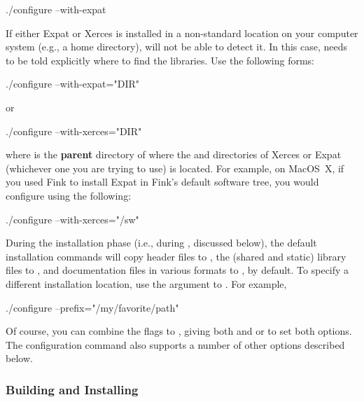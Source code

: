 \documentclass{sbmlmanual}
\begin{document}
\begin{example}[csh]
  ./configure --with-expat
\end{example}

If either Expat or Xerces is installed in a non-standard location on your
computer system (e.g., a home directory),  will not be
able to detect it.  In this case,  needs to be told
explicitly where to find the libraries.  Use the following forms:

\begin{example}[csh]
  ./configure --with-expat="DIR"
\end{example}
or
\begin{example}[csh]
  ./configure --with-xerces="DIR"
\end{example}

where  is the \textbf{parent} directory of where the
 and  directories of Xerces or Expat (whichever one
you are trying to use) is located.  For example, on MacOS~X, if you used
Fink to install Expat in Fink's default software tree, you would configure
\libsbml{} using the following:

\begin{example}[csh]
  ./configure --with-xerces="/sw"
\end{example}

During the installation phase (i.e., during , discussed
below), the default \libsbml{} installation commands will copy header files
to , the (shared and static) library files
to , and documentation files in various formats to
, by default.  To
specify a different installation location, use the 
argument to .  For example,

\begin{example}[csh]
  ./configure --prefix="/my/favorite/path"
\end{example}

Of course, you can combine the flags to , giving both
 and  or  to set
both options.  The \libsbml{} configuration command also supports a number
of other options described below.


\subsubsection{Building and Installing \libsbml{}}
\end{document}
